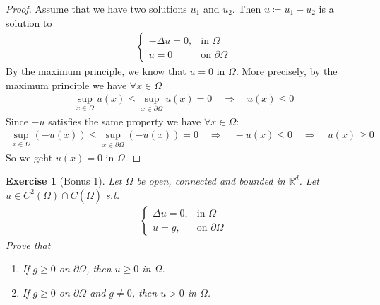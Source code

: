 \documentclass{report}
\theoremstyle{tommy}
\newtheorem{ex}[defn]{Exercise}
\begin{document}
  \begin{proof}
    Assume that we have two solutions \(u_1\) and \(u_2\). Then \(u \coloneqq u_1 - u_2\) is a solution to 
    \begin{align*}
      \begin{cases}
        - \Delta u = 0, &\text{in } \Omega \\
        u = 0 &\text{on } \partial \Omega
      \end{cases}
    \end{align*}
    By the maximum principle, we know that \(u = 0\) in \(\Omega\). More precisely, by the maximum principle we have \(\forall x \in \Omega\)
    \begin{align*}
      \sup_{x \in \Omega} u(x) \le \sup_{x \in \partial \Omega} u(x) = 0
      \quad \Rightarrow \quad
      u(x) \le 0
    \end{align*}
    Since \(-u\) satisfies the same property we have \(\forall x \in \Omega\):
    \begin{align*}
      \sup_{x \in \Omega}(-u(x)) \le \sup_{x \in \partial \Omega} (-u(x)) = 0
      \quad \Rightarrow \quad
      - u(x) \le 0
      \quad \Rightarrow \quad
      u(x) \ge 0
    \end{align*}
    So we geht \(u(x)  = 0\) in \(\Omega\).
  \end{proof}

  \begin{ex}[Bonus 1]\label{bonus-1}
    Let \(\Omega\) be open, connected and bounded in \(\mathbb{R}^d\). Let \(u \in C^2(\Omega) \cap C(\bar \Omega)\) s.t. 
    \begin{align*}
      \begin{cases}
        \Delta u = 0, &\text{in } \Omega \\
        u = g, &\text{on } \partial \Omega
      \end{cases}
    \end{align*}
    Prove that \begin{enumerate}[label=\alph*)]
      \item If \(g \ge 0\) on \(\partial \Omega\), then \(u \ge 0\) in \(\Omega\). 
      \item If \(g \ge 0\) on \(\partial \Omega\) and \(g \ne 0\), then \(u > 0\) in \(\Omega\).
    \end{enumerate}
  \end{ex}
\end{document}
